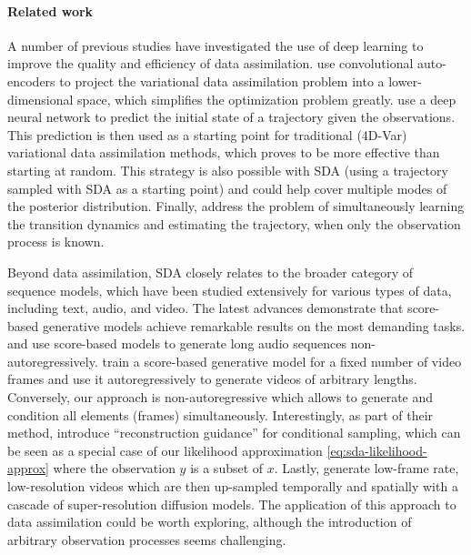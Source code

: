 \paragraph{Related work}
A number of previous studies have investigated the use of deep learning to improve the quality and efficiency of data assimilation. \textcite{mack2020attentionbased} use convolutional auto-encoders to project the variational data assimilation problem into a lower-dimensional space, which simplifies the optimization problem greatly.
\textcite{frerix2021variational} use a deep neural network to predict the initial state of a trajectory given the observations. This prediction is then used as a starting point for traditional (4D-Var) variational data assimilation methods, which proves to be more effective than starting at random. This strategy is also possible with SDA (using a trajectory sampled with SDA as a starting point) and could help cover multiple modes of the posterior distribution. Finally, \textcite{brajard2020combining} address the problem of simultaneously learning the transition dynamics and estimating the trajectory, when only the observation process is known.

Beyond data assimilation, SDA closely relates to the broader category of sequence models, which have been studied extensively for various types of data, including text, audio, and video. The latest advances demonstrate that score-based generative models achieve remarkable results on the most demanding tasks. \textcite{kong2021diffwave} and \textcite{goel2022its} use score-based models to generate long audio sequences non-autoregressively. \textcite{ho2022video} train a score-based generative model for a fixed number of video frames and use it autoregressively to generate videos of arbitrary lengths. Conversely, our approach is non-autoregressive which allows to generate and condition all elements (frames) simultaneously. Interestingly, as part of their method, \textcite{ho2022video} introduce \enquote{reconstruction guidance} for conditional sampling, which can be seen as a special case of our likelihood approximation \eqref{eq:sda-likelihood-approx} where the observation $y$ is a subset of $x$. Lastly, \textcite{ho2022imagen} generate low-frame rate, low-resolution videos which are then up-sampled temporally and spatially with a cascade \cite{ho2022cascaded} of super-resolution diffusion models. The application of this approach to data assimilation could be worth exploring, although the introduction of arbitrary observation processes seems challenging.

